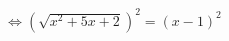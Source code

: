 \documentclass[preview]{standalone}
\begin{document}
\begin{align*}
\Leftrightarrow (\sqrt{x^2 + 5x + 2})^2 = (x - 1)^2
\end{align*}
\end{document}
